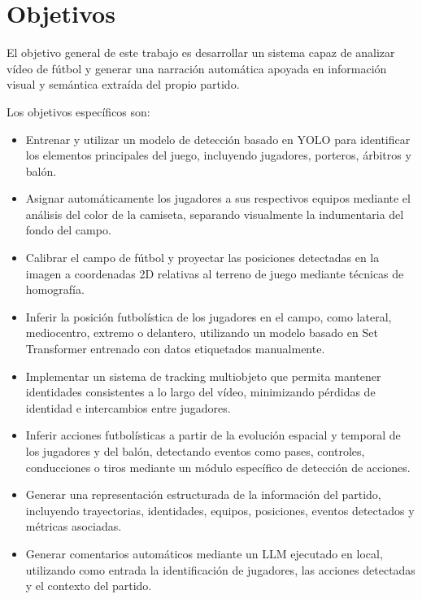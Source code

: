 \section{Objetivos}

El objetivo general de este trabajo es desarrollar un sistema capaz de analizar vídeo de fútbol y generar una narración automática apoyada en información visual y semántica extraída del propio partido.

Los objetivos específicos son:

\begin{itemize}
    \item Entrenar y utilizar un modelo de detección basado en YOLO para identificar los elementos principales del juego, incluyendo jugadores, porteros, árbitros y balón.

    \item Asignar automáticamente los jugadores a sus respectivos equipos mediante el análisis del color de la camiseta, separando visualmente la indumentaria del fondo del campo.

    \item Calibrar el campo de fútbol y proyectar las posiciones detectadas en la imagen a coordenadas 2D relativas al terreno de juego mediante técnicas de homografía.

    \item Inferir la posición futbolística de los jugadores en el campo, como lateral, mediocentro, extremo o delantero, utilizando un modelo basado en Set Transformer entrenado con datos etiquetados manualmente.

    \item Implementar un sistema de tracking multiobjeto que permita mantener identidades consistentes a lo largo del vídeo, minimizando pérdidas de identidad e intercambios entre jugadores.

    \item Inferir acciones futbolísticas a partir de la evolución espacial y temporal de los jugadores y del balón, detectando eventos como pases, controles, conducciones o tiros mediante un módulo específico de detección de acciones.

    \item Generar una representación estructurada de la información del partido, incluyendo trayectorias, identidades, equipos, posiciones, eventos detectados y métricas asociadas.

    \item Generar comentarios automáticos mediante un LLM ejecutado en local, utilizando como entrada la identificación de jugadores, las acciones detectadas y el contexto del partido.


\end{itemize}
